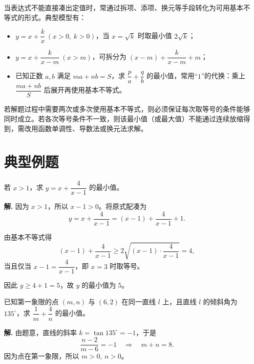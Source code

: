 \documentclass[11pt]{ctexrep}
\begin{document}
\begin{property}[常用配凑模型]
    当表达式不能直接凑出定值时，常通过拆项、添项、换元等手段转化为可用基本不等式的形式。典型模型有：
    \begin{itemize}
        \item $y = x + \dfrac{k}{x}\ (x > 0,\ k > 0)$，当 $x = \sqrt{k}$ 时取最小值 $2\sqrt{k}$；
        \item $y = x + \dfrac{k}{x - m}\ (x > m)$，可拆分为 $(x - m) + \dfrac{k}{x - m} + m$；
        \item 已知正数 $a, b$ 满足 $ma + nb = S$，求 $\dfrac{p}{a} + \dfrac{q}{b}$ 的最小值，常用“$1$”的代换：乘上 $\dfrac{ma + nb}{S}$ 后展开再使用基本不等式。
    \end{itemize}
\end{property}

\begin{property}[多次使用基本不等式的等号一致性]
    若解题过程中需要两次或多次使用基本不等式，则必须保证每次取等号的条件能够同时成立。若各次等号条件不一致，则该最小值（或最大值）不能通过连续放缩得到，需改用函数单调性、导数法或换元法求解。
\end{property}

\section*{典型例题}

\begin{example}[配凑定值求最小值]
    若 $x > 1$，求 $y = x + \dfrac{4}{x - 1}$ 的最小值。
\end{example}

\textbf{解.} 因为 $x > 1$，所以 $x - 1 > 0$。将原式配凑为
\[
    y = x + \frac{4}{x - 1} = (x - 1) + \frac{4}{x - 1} + 1.
\]

由基本不等式得
\[
    (x - 1) + \frac{4}{x - 1} \ge 2\sqrt{(x - 1) \cdot \frac{4}{x - 1}} = 4,
\]
当且仅当 $x - 1 = \dfrac{4}{x - 1}$，即 $x = 3$ 时取等号。

因此 $y \ge 4 + 1 = 5$，故 $y$ 的最小值为 $5$。

\begin{example}["1"的代换]
    已知第一象限的点 $(m, n)$ 与 $(6, 2)$ 在同一直线 $l$ 上，且直线 $l$ 的倾斜角为 $135^{\circ}$，求 $\dfrac{1}{m} + \dfrac{4}{n}$ 的最小值。
\end{example}

\textbf{解.} 由题意，直线的斜率 $k = \tan 135^{\circ} = -1$，于是
\[
    \frac{n - 2}{m - 6} = -1 \quad \Rightarrow \quad m + n = 8.
\]
因为点在第一象限，所以 $m > 0,\ n > 0$。
\end{document}
